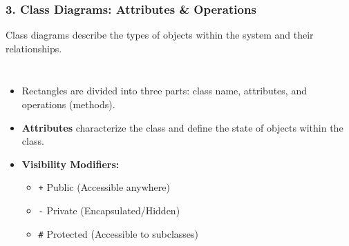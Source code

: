 \documentclass[xcolor=table]{beamer}
\begin{document}
\begin{frame}[fragile]
    \frametitle{3. Class Diagrams: Attributes \& Operations}
    Class diagrams describe the types of objects within the system and their relationships.
    
    \vspace{0.2cm}
    \begin{columns}
        \begin{itemize}
            \item Rectangles are divided into three parts: class name, attributes, and operations (methods).
            \item \textbf{Attributes} characterize the class and define the state of objects within the class.
            \item \textbf{Visibility Modifiers:}
                \begin{itemize}
                \item \texttt{+} Public (Accessible anywhere)
                \item \texttt{-} Private (Encapsulated/Hidden)
                \item \texttt{\#} Protected (Accessible to subclasses)
                \end{itemize}
        \end{itemize}
        
        \centering
    \end{columns}
\end{frame}
\end{document}
